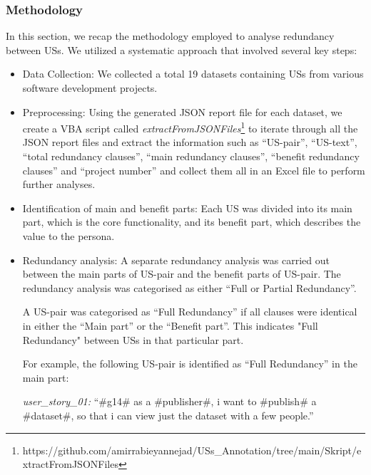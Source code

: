 \subsubsection*{Methodology}
In this section, we recap the methodology employed to analyse redundancy between USs. We utilized a systematic approach that involved several key steps:
\begin{itemize}
	
	\item Data Collection: We collected a total 19 datasets containing USs from various software development projects.
	
	\item Preprocessing: Using the generated JSON report file for each dataset, we create a VBA script called \textit{extractFromJSONFiles}\footnote{https://github.com/amirrabieyannejad/USs\_Annotation/tree/main/Skript/extractFromJSONFiles} to iterate through all the JSON report files and extract the information such as \enquote{US-pair}, \enquote{US-text}, \enquote{total redundancy clauses}, \enquote{main redundancy clauses}, \enquote{benefit redundancy clauses} and \enquote{project number} and collect them all in an Excel file to perform further analyses.
	
	\item Identification of main and benefit parts: Each US was divided into its main part, which is the core functionality, and its benefit part, which describes the value to the persona.
	
	\item Redundancy analysis: A separate redundancy analysis was carried out between the main parts of US-pair and the benefit parts of US-pair. The redundancy analysis was categorised as either \enquote{Full or Partial Redundancy}.
	
	\begin{definition}
	A US-pair was categorised as \enquote{Full Redundancy} if all clauses were identical in either the \enquote{Main part} or the \enquote{Benefit part}. This indicates "Full Redundancy" between USs in that particular part.
	\end{definition}
	\begin{example}
		For example, the following US-pair is identified as \enquote{Full Redundancy} in the main part:
		
		\textit{user\_story\_01:} \enquote{\#g14\# as a \#publisher\#, i want to \#publish\# a \#dataset\#, so that i can view just the dataset with a few people.}
		

\end{example}
\end{itemize}

